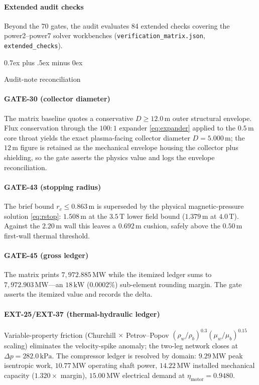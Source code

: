 \documentclass[11pt,journal,compsoc]{IEEEtran}
\makeatletter
\def\subsection{\@startsection{subsection}{2}{\z@}{-3.5ex plus -1.5ex minus -1.5ex}%
{0.7ex plus .5ex minus 0ex}{\normalfont\normalsize\sffamily\bfseries
\raggedright\hyphenpenalty=10000\exhyphenpenalty=10000\relax}}
\newcommand{\MW}{\,\mathrm{MW}}
\makeatother
\begin{document}
\paragraph{Extended audit checks}
Beyond the 70 gates, the audit evaluates 84 extended checks covering
the power2--power7 solver workbenches
(\texttt{verification\_matrix.json}, \texttt{extended\_checks}).

\subsection{Audit-note reconciliation}
\paragraph{GATE-30 (collector diameter)}
The matrix baseline quotes a conservative $D \ge 12.0\,\mathrm{m}$ outer
structural envelope. Flux conservation through the $100{:}1$ expander
\eqref{eq:expander} applied to the $0.5\,\mathrm{m}$ core throat yields the
exact plasma-facing collector diameter $D = 5.000\,\mathrm{m}$; the
$12\,\mathrm{m}$ figure is retained as the mechanical envelope housing the
collector plus shielding, so the gate asserts the physics value and logs
the envelope reconciliation.

\paragraph{GATE-43 (stopping radius)}
The brief bound $r_c \le 0.863\,\mathrm{m}$ is superseded by the physical
magnetic-pressure solution \eqref{eq:rstop}: $1.508\,\mathrm{m}$ at the
$3.5\,\mathrm{T}$ lower field bound ($1.379\,\mathrm{m}$ at $4.0\,\mathrm{T}$).
Against the $2.20\,\mathrm{m}$ wall this leaves a $0.692\,\mathrm{m}$
cushion, safely above the $0.50\,\mathrm{m}$ first-wall thermal threshold.

\paragraph{GATE-45 (gross ledger)}
The matrix prints $7{,}972.885\MW$ while the itemized ledger sums to
$7{,}972.903\MW$---an $18\,\mathrm{kW}$ ($0.0002\%$) sub-element rounding
margin. The gate asserts the itemized value and records the delta.

\paragraph{EXT-25/EXT-37 (thermal-hydraulic ledger)}
Variable-property friction (Churchill $\times$ Petrov--Popov
$(\rho_w/\rho_b)^{0.3}(\mu_w/\mu_b)^{0.15}$ scaling) eliminates the
velocity-spike anomaly; the two-leg network closes at $\Delta p =
282.0\,\mathrm{kPa}$. The compressor ledger is resolved by domain:
$9.29\,\mathrm{MW}$ peak isentropic work, $10.77\,\mathrm{MW}$ operating
shaft power, $14.22\,\mathrm{MW}$ installed mechanical capacity
($1.320\times$ margin), $15.00\,\mathrm{MW}$ electrical demand at
$\eta_{\mathrm{motor}} = 0.9480$.
\end{document}
